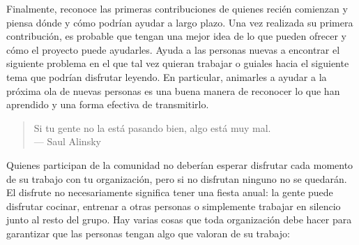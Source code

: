 Finalmente,
reconoce las primeras contribuciones de quienes recién comienzan
y piensa dónde y cómo podrían ayudar a largo plazo.
Una vez realizada su primera contribución,
es probable que tengan una mejor idea de lo que pueden ofrecer
y cómo el proyecto puede ayudarles.
Ayuda a las personas nuevas a encontrar el siguiente problema en el que tal vez quieran trabajar
o guiales hacia el siguiente tema que podrían disfrutar leyendo.
En particular,
animarles a ayudar a la próxima ola de nuevas personas
es una buena manera de reconocer lo que han aprendido
y una forma efectiva de transmitirlo.


\begin{quote}

 Si tu gente no la está pasando bien, algo está muy mal.\\
  --- Saul Alinsky

\end{quote}

Quienes participan de la comunidad no deberían esperar disfrutar cada momento de su trabajo con tu organización,
pero si no disfrutan ninguno
no se quedarán.
El disfrute no necesariamente significa tener una fiesta anual:
la gente puede disfrutar cocinar,
entrenar a otras personas
o simplemente trabajar en silencio junto al resto del grupo.
Hay varias cosas que toda organización debe hacer para garantizar
que las personas tengan algo que valoran de su trabajo:

